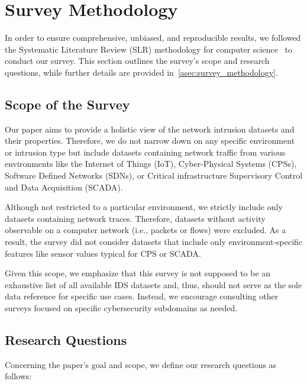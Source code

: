 
\section{Survey Methodology}
\label{sec:methodology}

In order to ensure comprehensive, unbiased, and reproducible results, we followed the Systematic Literature Review (SLR) methodology for computer science~\cite{kitchenhamm2007_guidelines_slr} to conduct our survey. This section outlines the survey's scope and research questions, while further details are provided in~\ref{asec:survey_methodology}.

\subsection{Scope of the Survey}
\label{ssec:meth_scope}

Our paper aims to provide a holistic view of the network intrusion datasets and their properties. Therefore, we do not narrow down on any specific environment or intrusion type but include datasets containing network traffic from various environments like the Internet of Things (IoT), Cyber-Physical Systems (CPSs), Software Defined Networks (SDNs), or Critical infrastructure Supervisory Control and Data Acquisition (SCADA).

Although not restricted to a particular environment, we strictly include only datasets containing network traces. Therefore, datasets without activity observable on a computer network (i.e., packets or flows) were excluded. As a result, the survey did not consider datasets that include only environment-specific features like sensor values typical for CPS or SCADA.

Given this scope, we emphasize that this survey is not supposed to be an exhaustive list of all available IDS datasets and, thus, should not serve as the sole data reference for specific use cases. Instead, we encourage consulting other surveys focused on specific cybersecurity subdomains as needed.

\subsection{Research Questions}
\label{ssec:meth_research_questions}

Concerning the paper's goal and scope, we define our research questions as follows:

